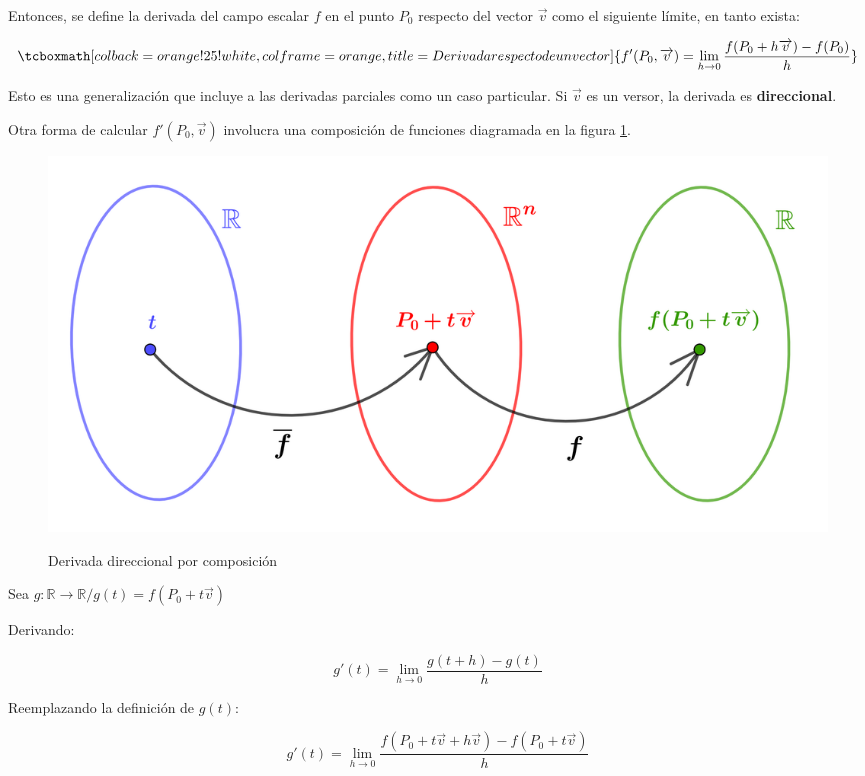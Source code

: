 \documentclass{article}
\renewcommand{\Bbb}{\mathbb}
\begin{document}
Entonces, se define la derivada del campo escalar $f$ en el punto $P_0$ respecto del vector $\overrightarrow{v}$ como el siguiente límite, en tanto exista:

\begin{equation}
\tcboxmath[colback=orange!25!white,colframe=orange, title=Derivada respecto de un vector]
{ f'(P_0, \overrightarrow{v}) = \lim_{h \rightarrow 0} \frac{f(P_0 + h \overrightarrow{v})-f(P_0)}{h} }
\end{equation}

Esto es una generalización que incluye a las derivadas parciales como un caso particular. Si $\overrightarrow{v}$ es un versor, la derivada es \textbf{direccional}.

Otra forma de calcular $f'(P_0, \overrightarrow{v})$ involucra una composición de funciones diagramada en la figura \ref{fig:deriv_direcc_comp}.

\begin{figure}[ht]
\centering
\caption{Derivada direccional por composición}
\includegraphics[scale=0.75]{img/derivadas/deriv_direcc_mapeo.png}
\label{fig:deriv_direcc_comp}
\end{figure} 

Sea $g:\Bbb R \rightarrow \Bbb R / g(t) = f(P_0 + t \overrightarrow{v})$

Derivando:

\begin{equation}
g'(t) = \lim_{h \rightarrow 0} \frac{g(t+h)-g(t)}{h}
\end{equation}

Reemplazando la definición de $g(t)$:

\begin{equation}
g'(t) = \lim_{h \rightarrow 0} \frac{f(P_0 + t \overrightarrow{v} + h \overrightarrow{v}) - f(P_0 + t \overrightarrow{v})}{h}
\end{equation}
\end{document}
